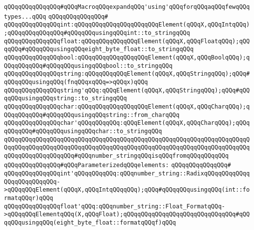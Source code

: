 \newline
\newline
\verb|qQQqqQQqqQQqqQQq#qQQqMacroqQQqexpandqQQq'using'qQQqforqQQqaqQQqfewqQQqtypes...qQQq|\newline
\verb|qQQqqQQqqQQqqQQq#|\newline
\verb|qQQqqQQqqQQqqQQqint:qQQqqQQqqQQqqQQqqQQqqQQqElement(qQQqX,qQQqIntqQQq);qQQqqQQqqQQqqQQq#qQQqqQQqusingqQQqint::to_stringqQQq|\newline
\verb|qQQqqQQqqQQqqQQqfloat:qQQqqQQqqQQqqQQqElement(qQQqX,qQQqFloatqQQq);qQQqqQQq#qQQqqQQqusingqQQqeight_byte_float::to_stringqQQq|\newline
\verb|qQQqqQQqqQQqqQQqbool:qQQqqQQqqQQqqQQqqQQqElement(qQQqX,qQQqBoolqQQq);qQQqqQQqqQQq#qQQqqQQqusingqQQqbool::to_stringqQQq|\newline
\verb|qQQqqQQqqQQqqQQqstring:qQQqqQQqqQQqElement(qQQqX,qQQqStringqQQq);qQQq#qQQqqQQqusingqQQq(fnqQQqxqQQq=>qQQqx)qQQq|\newline
\verb|qQQqqQQqqQQqqQQqstring'qQQq:qQQqElement(qQQqX,qQQqStringqQQq);qQQq#qQQqqQQqusingqQQqstring::to_stringqQQq|\newline
\verb|qQQqqQQqqQQqqQQqchar:qQQqqQQqqQQqqQQqqQQqElement(qQQqX,qQQqCharqQQq);qQQqqQQqqQQq#qQQqqQQqusingqQQqstring::from_charqQQq|\newline
\verb|qQQqqQQqqQQqqQQqchar'qQQqqQQqqQQq:qQQqElement(qQQqX,qQQqCharqQQq);qQQqqQQqqQQq#qQQqqQQqusingqQQqchar::to_stringqQQq|\newline
\newline
\newline
\verb|qQQqqQQqqQQqqQQqqQQqqQQqqQQqqQQqqQQqqQQqqQQqqQQqqQQqqQQqqQQqqQQqqQQqqQQqqQQqqQQqqQQqqQQqqQQqqQQqqQQqqQQqqQQqqQQqqQQqqQQqqQQqqQQqqQQqqQQqqQQqqQQqqQQqqQQqqQQqqQQq#qQQqnumber_stringqQQqisqQQqfromqQQqqQQqqQQq|\newline
\newline
\verb|qQQqqQQqqQQqqQQq#qQQqParameterizedqQQqelements:|\newline
\verb|qQQqqQQqqQQqqQQq#|\newline
\verb|qQQqqQQqqQQqqQQqint'qQQqqQQqqQQq:qQQqnumber_string::RadixqQQqqQQqqQQqqQQqqQQqqQQqqQQq->qQQqqQQqElement(qQQqX,qQQqIntqQQqqQQq);qQQq#qQQqqQQqusingqQQq(int::formatqQQqr)qQQq|\newline
\verb|qQQqqQQqqQQqqQQqfloat'qQQq:qQQqnumber_string::Float_FormatqQQq->qQQqqQQqElementqQQq(X,qQQqFloat);qQQqqQQqqQQqqQQqqQQqqQQqqQQqqQQq#qQQqqQQqusingqQQq(eight_byte_float::formatqQQqf)qQQq|\newline
